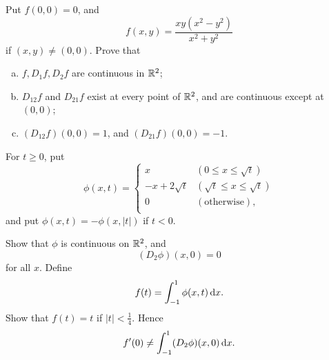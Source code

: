 \begin{myExercise}
    \label{ex:9.27}
    Put $f(0,0)=0$, and 
    \begin{equation*}
        f(x,y) = \frac{xy(x^2-y^2)}{x^2+y^2}
    \end{equation*}
    if $(x,y) \neq (0,0)$.
    Prove that 
    \begin{enumerate}[(a)]
        \item $f, D_1 f, D_2 f$ are continuous in ${\protect\mathbb R}^2$;
        \item $D_{12}f$ and $D_{21}f$ exist at every point of ${\protect\mathbb R}^2$, and are continuous except at $(0, 0)$;
        \item $(D_{12}f)(0,0)=1$, and $(D_{21}f)(0,0)=-1$.
    \end{enumerate}
\end{myExercise}


\begin{myExercise}
    \label{ex:9.28}
    For $t \geq 0$, put
    \begin{equation*}
        \phi(x,t) = \left\{ 
            \begin{array}{ll}
                x & (0 \leq x \leq \sqrt{t}) \\
                -x+2\sqrt{t} & (\sqrt{t} \leq x \leq \sqrt{t}) \\
                0 & (\text{otherwise}), \\
            \end{array}
         \right.
    \end{equation*}
    and put $\phi(x,t)=-\phi(x,|t|)$ if $t<0$.

    Show that $\phi$ is continuous on ${\protect\mathbb R}^2$, and 
    \begin{equation*}
        (D_2 \phi)(x, 0) = 0
    \end{equation*}
    for all $x$. 
    Define 
    \begin{equation*}
        f(t) = \int_{-1}^{1} \phi (x,t) \d x.
    \end{equation*}
    Show that $f(t)=t$ if $|t|<\frac{1}{4}$.
    Hence 
    \begin{equation*}
        f'(0) \neq \int_{-1}^{1} (D_2 \phi) (x,0) \d x.
    \end{equation*}
\end{myExercise}



